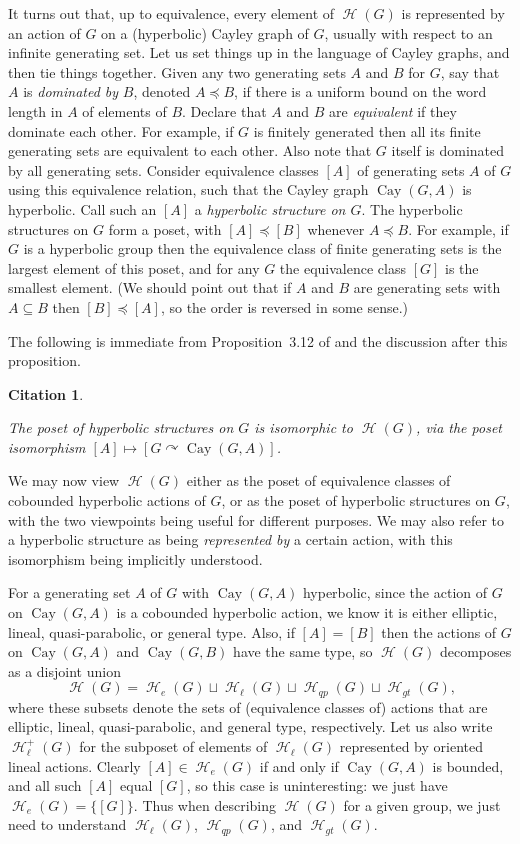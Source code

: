 \documentclass[reqno,12pt]{amsart}\setcounter{tocdepth}{1}
\newtheorem{cit}[theorem]{Citation}
\theoremstyle{definition}
\DeclareMathOperator{\Hyp}{\mathcal{H}}
\DeclareMathOperator{\Cay}{Cay}
\numberwithin{equation}{section}
\begin{document}
It turns out that, up to equivalence, every element of $\Hyp(G)$ is represented by an action of $G$ on a (hyperbolic) Cayley graph of $G$, usually with respect to an infinite generating set. Let us set things up in the language of Cayley graphs, and then tie things together. Given any two generating sets $A$ and $B$ for $G$, say that $A$ is \emph{dominated by} $B$, denoted $A\preceq B$, if there is a uniform bound on the word length in $A$ of elements of $B$. Declare that $A$ and $B$ are \emph{equivalent} if they dominate each other. For example, if $G$ is finitely generated then all its finite generating sets are equivalent to each other. Also note that $G$ itself is dominated by all generating sets. Consider equivalence classes $[A]$ of generating sets $A$ of $G$ using this equivalence relation, such that the Cayley graph $\Cay(G,A)$ is hyperbolic. Call such an $[A]$ a \emph{hyperbolic structure on $G$}. The hyperbolic structures on $G$ form a poset, with $[A]\preccurlyeq [B]$ whenever $A\preceq B$. For example, if $G$ is a hyperbolic group then the equivalence class of finite generating sets is the largest element of this poset, and for any $G$ the equivalence class $[G]$ is the smallest element. (We should point out that if $A$ and $B$ are generating sets with $A\subseteq B$ then $[B]\preccurlyeq [A]$, so the order is reversed in some sense.)

The following is immediate from Proposition~3.12 of \cite{ABO} and the discussion after this proposition.

\begin{cit}
\label{cit:cayley:representative}

The poset of hyperbolic structures on $G$ is isomorphic to $\Hyp(G)$, via the poset isomorphism $[A]\mapsto [G\curvearrowright \Cay(G,A)]$.
\end{cit}

We may now view $\Hyp(G)$ either as the poset of equivalence classes of cobounded hyperbolic actions of $G$, or as the poset of hyperbolic structures on $G$, with the two viewpoints being useful for different purposes. We may also refer to a hyperbolic structure as being \emph{represented by} a certain action, with this isomorphism being implicitly understood. 

For a generating set $A$ of $G$ with $\Cay(G,A)$ hyperbolic, since the action of $G$ on $\Cay(G,A)$ is a cobounded hyperbolic action, we know it is either elliptic, lineal, quasi-parabolic, or general type. Also, if $[A]=[B]$ then the actions of $G$ on $\Cay(G,A)$ and $\Cay(G,B)$ have the same type, so $\Hyp(G)$ decomposes as a disjoint union
\[
\Hyp(G) = \Hyp_e(G) \sqcup \Hyp_\ell(G) \sqcup \Hyp_{qp}(G) \sqcup \Hyp_{gt}(G)\text{,}
\]
where these subsets denote the sets of (equivalence classes of) actions that are elliptic, lineal, quasi-parabolic, and general type, respectively. Let us also write $\Hyp_\ell^+(G)$ for the subposet of elements of $\Hyp_\ell(G)$ represented by oriented lineal actions. Clearly $[A]\in\Hyp_e(G)$ if and only if $\Cay(G,A)$ is bounded, and all such $[A]$ equal $[G]$, so this case is uninteresting: we just have $\Hyp_e(G)=\{[G]\}$. Thus when describing $\Hyp(G)$ for a given group, we just need to understand $\Hyp_\ell(G)$, $\Hyp_{qp}(G)$, and $\Hyp_{gt}(G)$.
\end{document}
